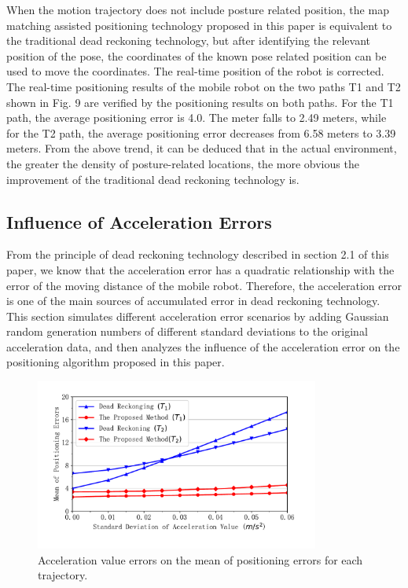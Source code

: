\documentclass{llncs}
\begin{document}
When the motion trajectory does not include posture related position, the map matching assisted positioning technology proposed in this paper is equivalent to the traditional dead reckoning technology, but after identifying the relevant position of the pose, the coordinates of the known pose related position can be used to move the coordinates. The real-time position of the robot is corrected. The real-time positioning results of the mobile robot on the two paths T1 and T2 shown in Fig. 9 are verified by the positioning results on both paths. For the T1 path, the average positioning error is 4.0. The meter falls to 2.49 meters, while for the T2 path, the average positioning error decreases from 6.58 meters to 3.39 meters. From the above trend, it can be deduced that in the actual environment, the greater the density of posture-related locations, the more obvious the improvement of the traditional dead reckoning technology is.


\subsection{Influence of Acceleration Errors}

From the principle of dead reckoning technology described in section 2.1 of this paper, we know that the acceleration error has a quadratic relationship with the error of the moving distance of the mobile robot. Therefore, the acceleration error is one of the main sources of accumulated error in dead reckoning technology. This section simulates different acceleration error scenarios by adding Gaussian random generation numbers of different standard deviations to the original acceleration data, and then analyzes the influence of the acceleration error on the positioning algorithm proposed in this paper.

\begin{figure}[!htbp]
	\centering
	\includegraphics[width=3.676in]{RobotMatch-AcceError}
	\caption{Acceleration value errors on the mean of positioning errors for each trajectory.}
	\label{fig-acce-error}
\end{figure}
\end{document}
